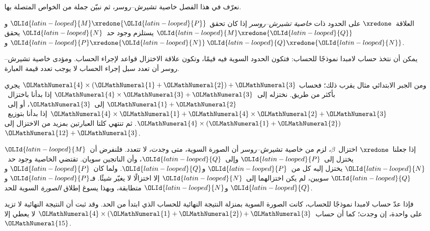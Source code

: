 \documentclass[../../../include/open-logic-section]{subfiles}
\begin{document}


نعرّف في هذا الفصل خاصية تشيرش--روسر، ثم نبيّن جملة من الخواص المتصلة بها.

\begin{defn} العلاقة~$\xredone$ على الحدود
  ذات \emph{خاصية تشيرش--روسر} إذا كان تحقق
  ${\OLId{latin-looped}{M}} \xredone {\OLId{latin-looped}{P}}$ و${\OLId{latin-looped}{M}} \xredone {\OLId{latin-looped}{Q}}$ يستلزم وجود حد~${\OLId{latin-looped}{N}}$ يحقق
  ${\OLId{latin-looped}{P}} \xredone {\OLId{latin-looped}{N}}$ و${\OLId{latin-looped}{Q}} \xredone {\OLId{latin-looped}{N}}$.
\end{defn}

يمكن أن نتخذ حساب لامبدا نموذجًا للحساب: فتكون الحدود السوية فيه قيمًا،
وتكون علاقة الاختزال قواعد لإجراء الحساب.
ومؤدى خاصية تشيرش--روسر أن تعدد سبل إجراء الحساب لا يوجب تعدد قيمة العبارة.

ومن الجبر الابتدائي مثال يقرب ذلك؛ فحساب
${\OLMathNumeral{4}} \times ({\OLMathNumeral{1}}+{\OLMathNumeral{2}}) + {\OLMathNumeral{3}}$ يجري بأكثر من طريق.
نختزله إلى~${\OLMathNumeral{4}} \times {\OLMathNumeral{3}}+{\OLMathNumeral{3}}$ إذا بدأنا باختزال~${\OLMathNumeral{1}}+{\OLMathNumeral{2}}$ إلى~${\OLMathNumeral{3}}$،
أو إلى~${\OLMathNumeral{4}} \times {\OLMathNumeral{1}}+{\OLMathNumeral{4}} \times {\OLMathNumeral{2}}+{\OLMathNumeral{3}}$ إذا بدأنا بتوزيع~${\OLMathNumeral{4}} \times ({\OLMathNumeral{1}}+{\OLMathNumeral{2}})$.
ثم تنتهي كلتا العبارتين بمزيد من الاختزال إلى~${\OLMathNumeral{12}}+{\OLMathNumeral{3}}$.

إذا جعلنا~$\xredone$ اختزال~$\beta$، لزم من خاصية تشيرش--روسر أن الصورة السوية،
متى وجدت، لا تتعدد. فلنفرض أن~${\OLId{latin-looped}{M}}$ يختزل إلى~${\OLId{latin-looped}{P}}$ وإلى~${\OLId{latin-looped}{Q}}$،
وأن الناتجين سويان. تقتضي الخاصية وجود حد~${\OLId{latin-looped}{N}}$ يختزل إليه كل من~${\OLId{latin-looped}{P}}$ و${\OLId{latin-looped}{Q}}$.
ولما كان~${\OLId{latin-looped}{P}}$ و${\OLId{latin-looped}{Q}}$ سويين، لم يكن اختزالهما إلى~${\OLId{latin-looped}{N}}$ إلا اختزالًا لا يغيّر شيئًا.
فـ${\OLId{latin-looped}{P}}$ و${\OLId{latin-looped}{Q}}$ و${\OLId{latin-looped}{N}}$ متطابقة، وبهذا يسوغ إطلاق \emph{الصورة} السوية للحد.

فإذا عدّ حساب لامبدا نموذجًا للحساب، كانت الصورة السوية بمنزلة النتيجة النهائية
للحساب الذي ابتدأ من الحد. وقد ثبت أن النتيجة النهائية لا تزيد على واحدة،
إن وجدت؛ كما أن حساب~${\OLMathNumeral{4}} \times ({\OLMathNumeral{1}}+{\OLMathNumeral{2}})+{\OLMathNumeral{3}}$ لا يعطي إلا~${\OLMathNumeral{15}}$.
\end{document}
